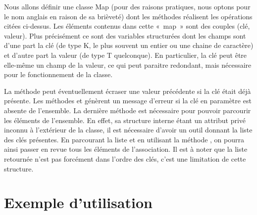 	Nous allons définir une classe Map (pour des raisons pratiques, 
	nous optons pour le nom anglais en raison de sa
	brièveté) dont les méthodes réalisent les opérations 
	citées ci-dessus. Les éléments contenus dans cette «~map~» sont
	des couples (clé, valeur). Plus précisément ce sont des variables 
	structurées dont les champs sont d'une part la clé
	(de type K, le plus souvent un entier ou une chaine de caractère) 
	et d'autre part la valeur (de type T quelconque). En
	particulier, la clé peut être elle-même un champ de la 
	valeur, ce qui peut paraitre redondant, mais nécessaire pour le
	fonctionnement de la classe.
	

	La méthode  peut éventuellement 
	écraser une valeur précédente si la clé était déjà présente. 
	Les méthodes  et 
	 génèrent un message d'erreur si la clé en
	paramètre est absente de l'ensemble. La dernière méthode est 
	nécessaire pour pouvoir parcourir les éléments de l'ensemble. 
	En effet, sa structure interne étant un attribut privé inconnu 
	à l'extérieur de la classe, il est nécessaire d'avoir un outil 
	donnant la liste des clés présentes. En parcourant la liste et 
	en utilisant la méthode , 
	on pourra ainsi passer en revue tous les éléments de l'association. 
	Il est à noter que la liste retournée n'est pas forcément dans 
	l'ordre des clés, c'est une limitation de cette structure.
	

\section{Exemple d'utilisation}

